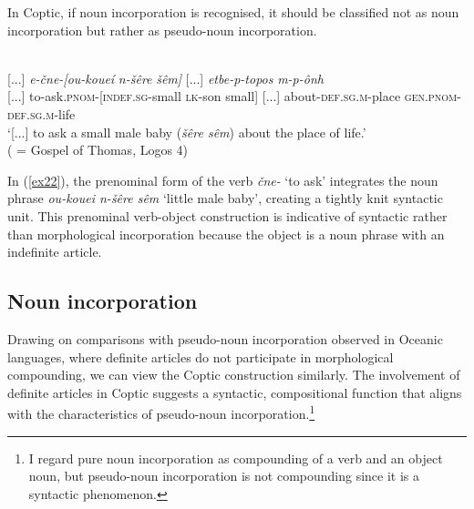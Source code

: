 \documentclass[output=paper,colorlinks,citecolor=brown ,chinesefont]{langscibook}
\begin{document}


In Coptic, if noun incorporation is recognised, it should be classified not as noun incorporation but rather as pseudo-noun incorporation.

\begin{exe}
    \ex\label{ex22} 
    \glll \coptic{[...]}    \coptic{[...]}   \\
    {}[...] \textit{e-čne-[ou-koueí}			\textit{n-šêre} \textit{šêm]}	[...]	\textit{etbe-p-topos}	\textit{m-p-ônh} \\
    {}[...] to-ask.\textsc{pnom}-[\textsc{indef}.\textsc{sg}-small	\textsc{lk}-son small] 	[...]	about-\textsc{def}.\textsc{sg}.\textsc{m}-place	\textsc{gen}.\textsc{pnom}-\textsc{def}.\textsc{sg}.\textsc{m}-life \\
    \glt 	‘[...] to ask a small male baby (\textit{šêre sêm}) about the place of life.' \\
    \hspace*{\fill}( = Gospel of Thomas, Logos 4)
\end{exe}

In (\ref{ex22}), the prenominal form of the verb  \textit{čne-} ‘to ask' integrates the noun phrase  \textit{ou-kouei n-šêre sêm} ‘little male baby', creating a tightly knit syntactic unit. This prenominal verb-object construction is indicative of syntactic rather than morphological incorporation because the object is a noun phrase with an indefinite article.

\subsection{Noun incorporation}

Drawing on comparisons with pseudo-noun incorporation observed in Oceanic languages, where definite articles do not participate in morphological compounding, we can view the Coptic construction similarly. The involvement of definite articles in Coptic suggests a syntactic, compositional function that aligns with the characteristics of pseudo-noun incorporation.\footnote{I regard pure noun incorporation as compounding of a verb and an object noun, but pseudo-noun incorporation is not compounding since it is a syntactic phenomenon.}
\end{document}
